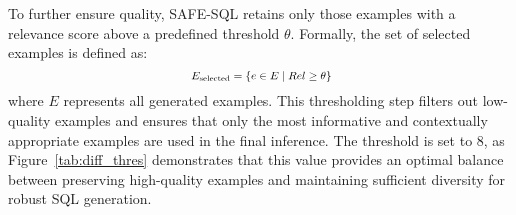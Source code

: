 \begin{comment}
To ensure high-quality examples, only examples with a relevance score above a predefined threshold \( T \) are retained:
\[
E_{\text{selected}} = \{ e \in E \mid R(e) \geq 
\theta\ \},
\]
where \( E_{\text{selected}} \) is the set of selected examples, \( E \) is the set of all generated examples, and \(\theta\)  is the threshold value (e.g., \( T = 8 \)). By filtering out low-scoring examples and prioritizing those with the highest scores, SAFE-SQL ensures that the final SQL query generation process is guided by high-quality, contextually appropriate examples. The relevance scoring mechanism acts as a self-assessment tool, enabling the framework to dynamically adapt to the complexity of the test question and maintain consistency and accuracy.
\end{comment}
To further ensure quality, SAFE-SQL retains only those examples with a relevance score above a predefined threshold \( \theta \). Formally, the set of selected examples is defined as:
\begin{equation}\resizebox{0.30\textwidth}{!}{
$E_{\text{selected}} = \{ e \in E \mid Rel \geq \theta \}$}
\end{equation}
where \( E \) represents all generated examples. This thresholding step filters out low-quality examples and ensures that only the most informative and contextually appropriate examples are used in the final inference. The threshold is set to 8, as Figure~\ref{tab:diff_thres} demonstrates that this value provides an optimal balance between preserving high-quality examples and maintaining sufficient diversity for robust SQL generation.


